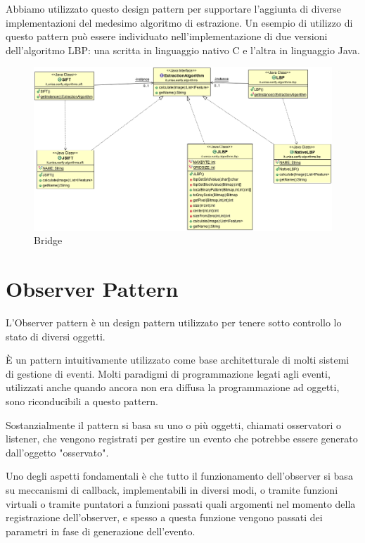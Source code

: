 Abbiamo utilizzato questo design pattern per supportare l'aggiunta di diverse implementazioni del medesimo algoritmo di estrazione. Un esempio di utilizzo di questo pattern può essere individuato nell'implementazione di due versioni dell'algoritmo LBP: una scritta in linguaggio nativo C e l'altra in linguaggio Java.

\begin{figure}[ht]
	\centering
	\includegraphics[width=1.5\textwidth, angle=90]{img/bridge.png}
	\caption{Bridge}\label{fig:bridge}
\end{figure}

\section{Observer Pattern}
L'Observer pattern è un design pattern utilizzato per tenere sotto controllo lo stato di diversi oggetti.

È un pattern intuitivamente utilizzato come base architetturale di molti sistemi di gestione di eventi. Molti paradigmi di programmazione legati agli eventi, utilizzati anche quando ancora non era diffusa la programmazione ad oggetti, sono riconducibili a questo pattern.

Sostanzialmente il pattern si basa su uno o più oggetti, chiamati osservatori o listener, che vengono registrati per gestire un evento che potrebbe essere generato dall'oggetto "osservato".

Uno degli aspetti fondamentali è che tutto il funzionamento dell'observer si basa su meccanismi di callback, implementabili in diversi modi, o tramite funzioni virtuali o tramite puntatori a funzioni passati quali argomenti nel momento della registrazione dell'observer, e spesso a questa funzione vengono passati dei parametri in fase di generazione dell'evento.

